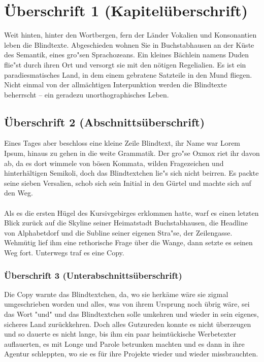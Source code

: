 \documentclass[../thesis.tex]{subfiles}
\begin{document}
\chapter{Überschrift 1 (Kapitelüberschrift)}

Weit hinten, hinter den Wortbergen, fern der Länder Vokalien und Konsonantien leben die Blindtexte. Abgeschieden wohnen Sie in Buchstabhausen an der Küste des Semantik, eines gro"sen Sprachozeans. Ein kleines Bächlein namens Duden flie"st durch ihren Ort und versorgt sie mit den nötigen Regelialien. Es ist ein paradiesmatisches Land, in dem einem gebratene Satzteile in den Mund fliegen. Nicht einmal von der allmächtigen Interpunktion werden die Blindtexte beherrscht – ein geradezu unorthographisches Leben.

\section{Überschrift 2 (Abschnittsüberschrift)}

Eines Tages aber beschloss eine kleine Zeile Blindtext, ihr Name war Lorem Ipsum, hinaus zu gehen in die weite Grammatik. Der gro"se Oxmox riet ihr davon ab, da es dort wimmele von bösen Kommata, wilden Fragezeichen und hinterhältigen Semikoli, doch das Blindtextchen lie"s sich nicht beirren. Es packte seine sieben Versalien, schob sich sein Initial in den Gürtel und machte sich auf den Weg.\\
\\
Als es die ersten Hügel des Kursivgebirges erklommen hatte, warf es einen letzten Blick zurück auf die Skyline seiner Heimatstadt Buchstabhausen, die Headline von Alphabetdorf und die Subline seiner eigenen Stra"se, der Zeilengasse. Wehmütig lief ihm eine rethorische Frage über die Wange, dann setzte es seinen Weg fort. Unterwegs traf es eine Copy.

\subsection{Überschrift 3 (Unterabschnittsüberschrift)}

Die Copy warnte das Blindtextchen, da, wo sie herkäme wäre sie zigmal umgeschrieben worden und alles, was von ihrem Ursprung noch übrig wäre, sei das Wort "und" und das Blindtextchen solle umkehren und wieder in sein eigenes, sicheres Land zurückkehren. Doch alles Gutzureden konnte es nicht überzeugen und so dauerte es nicht lange, bis ihm ein paar heimtückische Werbetexter auflauerten, es mit Longe und Parole betrunken machten und es dann in ihre Agentur schleppten, wo sie es für ihre Projekte wieder und wieder missbrauchten.
\end{document}
